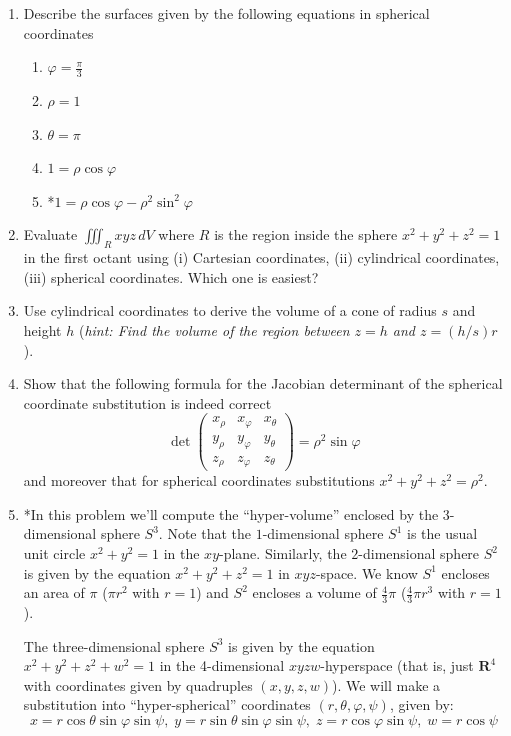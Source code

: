 \documentclass[12pt]{article}
\numberwithin{equation}{subsection}
\numberwithin{figure}{subsection}
\theoremstyle{note}
\begin{document}
{\begin{enumerate}[label=\arabic*.]
\item Describe the surfaces given by the following equations in spherical coordinates

\begin{enumerate}
	\item $\varphi=\frac{\pi}{3}$
	\item $\rho=1$
	\item $\theta=\pi$
	\item $1=\rho \cos \varphi$
	\item *$1=\rho \cos \varphi - \rho^2 \sin^2 \varphi$

\end{enumerate}

\item Evaluate $\iiint_R xyz \,dV$ where $R$ is the region inside the sphere $x^2+y^2+z^2=1$ in the first octant using (i) Cartesian coordinates, (ii) cylindrical coordinates, (iii) spherical coordinates. Which one is easiest?

\item Use cylindrical coordinates to derive the volume of a cone of radius $s$ and height $h$ (\textit{hint: Find the volume of the region between $z=h$ and $z=(h/s)r$}).

\item Show that the following formula for the Jacobian determinant of the spherical coordinate substitution is indeed correct \[ \det \left( \begin{matrix} x_{\rho} & x_{\varphi} & x_{\theta} \\ y_{\rho} & y_{\varphi} & y_{\theta} \\ z_{\rho} & z_{\varphi} & z_{\theta} \end{matrix} \right)= \rho^2 \sin \varphi \]
and moreover that for spherical coordinates substitutions $x^2+y^2+z^2=\rho^2$.

\item *In this problem we'll compute the ``hyper-volume'' enclosed by the 3-dimensional sphere $S^3$. Note that the $1$-dimensional sphere $S^1$ is the usual unit circle $x^2+y^2=1$ in the $xy$-plane. Similarly, the $2$-dimensional sphere $S^2$ is given by the equation $x^2+y^2+z^2=1$ in $xyz$-space. We know $S^1$ encloses an area of $\pi$ ($\pi r^2$ with $r=1$) and $S^2$ encloses a volume of $\frac{4}{3}\pi$ ($\frac{4}{3}\pi r^3$ with $r=1$). 

The three-dimensional sphere $S^3$ is given by the equation $x^2+y^2+z^2+w^2=1$ in the 4-dimensional $xyzw$-hyperspace (that is, just $\mathbf{R}^4$ with coordinates given by quadruples $(x,y,z,w)$). We will make a substitution into ``hyper-spherical'' coordinates $(r,\theta, \varphi, \psi)$, given by:
\[x=r \cos\theta \sin \varphi \sin \psi, \; y=r \sin \theta \sin \varphi \sin \psi , \; z=r \cos \varphi\sin \psi , \; w=r\cos \psi\]


\end{enumerate}}
\end{document}
